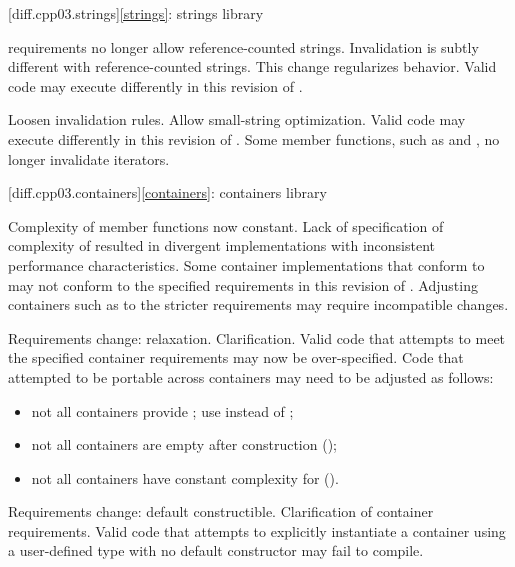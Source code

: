 [diff.cpp03.strings]{\ref{strings}: strings library}

\change
{} requirements no longer allow reference-counted
strings.
\rationale
Invalidation is subtly different with reference-counted strings.
This change regularizes behavior.
\effect
Valid \CppIII{} code may execute differently in this revision of \Cpp{}.

\change
Loosen  invalidation rules.
\rationale
Allow small-string optimization.
\effect
Valid \CppIII{} code may execute differently in this revision of \Cpp{}.
Some  member functions, such as  and ,
no longer invalidate iterators.

[diff.cpp03.containers]{\ref{containers}: containers library}

\change
Complexity of  member functions now constant.
\rationale
Lack of specification of complexity of  resulted in
divergent implementations with inconsistent performance characteristics.
\effect
Some container implementations that conform to \CppIII{} may not conform to the
specified  requirements in this revision of \Cpp{}. Adjusting
containers such as  to the stricter requirements may require
incompatible changes.

\change
Requirements change: relaxation.
\rationale
Clarification.
\effect
Valid \CppIII{} code that attempts to meet the specified container requirements
may now be over-specified. Code that attempted to be portable across containers
may need to be adjusted as follows:
\begin{itemize}
\item not all containers provide ; use  instead
of ;
\item not all containers are empty after construction ();
\item not all containers have constant complexity for  ().
\end{itemize}

\change
Requirements change: default constructible.
\rationale
Clarification of container requirements.
\effect
Valid \CppIII{} code that attempts to explicitly instantiate a container using
a user-defined type with no default constructor may fail to compile.

